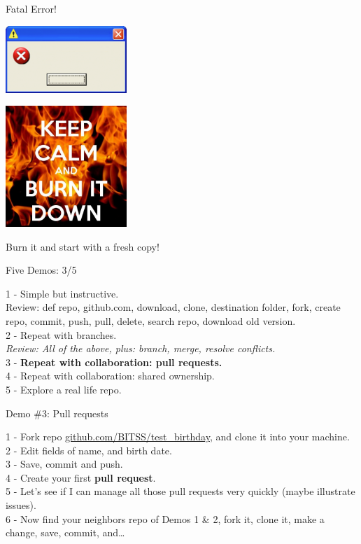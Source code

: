\documentclass[ignorenonframetext,]{beamer}
\begin{document}
\begin{frame}{Fatal Error!}
\protect\hypertarget{fatal-error}{}

\centering

\includegraphics[height=1in]{../Images/error_image.png}

\pause

\includegraphics[height=1.8in]{../Images/calm_burn.jpg}

\LARGE{Burn it and start with a fresh copy!}

\end{frame}

\begin{frame}{Five Demos: 3/5}
\protect\hypertarget{five-demos-35}{}

1 - Simple but instructive.\\
Review: def repo, github.com, download, clone, destination folder, fork,
create repo, commit, push, pull, delete, search repo, download old
version.\\
2 - Repeat with branches.\\
\emph{Review: All of the above, plus: branch, merge, resolve
conflicts.}\\
3 - \textbf{Repeat with collaboration: pull requests.}\\
4 - Repeat with collaboration: shared ownership.\\
5 - Explore a real life repo.

\end{frame}

\begin{frame}{Demo \#3: Pull requests}
\protect\hypertarget{demo-3-pull-requests}{}

1 - Fork repo
\href{https://github.com/BITSS/test_birthday}{github.com/BITSS/test\_birthday},
and clone it into your machine.\\
2 - Edit fields of name, and birth date.\\
3 - Save, commit and push.\\
4 - Create your first \textbf{pull request}.\\
5 - Let's see if I can manage all those pull requests very quickly
(maybe illustrate issues).\\
6 - Now find your neighbors repo of Demos 1 \& 2, fork it, clone it,
make a change, save, commit, and\ldots{}

\end{frame}
\end{document}
